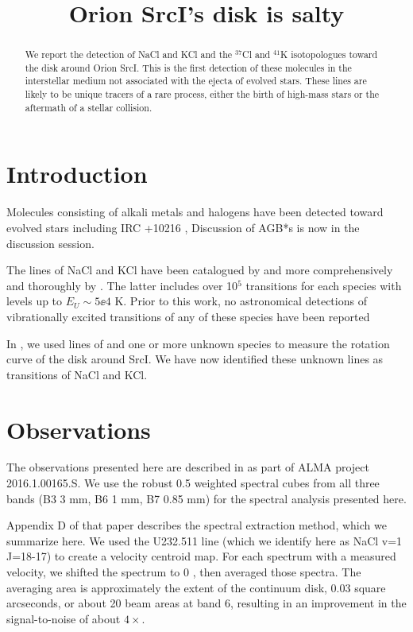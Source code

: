 \documentclass[twocolumn]{aastex62}
\newcommand{\sourcei}{SrcI\xspace}
\begin{document}


\title{Orion \sourcei's disk is salty}
\begin{abstract}
    We report the detection of NaCl and KCl and the $^{37}$Cl and $^{41}$K
    isotopologues toward the disk around Orion \sourcei.
    This is the first detection of these molecules in the interstellar
    medium not associated with the ejecta of evolved stars.
    These lines are likely to be unique tracers of a rare process, either
    the birth of high-mass stars or the aftermath of a stellar collision.
\end{abstract}

\section{Introduction}
Molecules consisting of alkali metals and halogens have been detected
toward evolved stars including IRC +10216 \citep{Cernicharo1987a},
{\color{red}Discussion of AGB*s is now in the discussion session.}

The lines of NaCl and KCl have been catalogued by \citet{Caris2004a}
and more comprehensively and thoroughly by \citet{Barton2014a}.
The latter includes over 10$^5$ transitions for each species
with levels up to $E_U\sim5\ee{4}$ K.  Prior to this work,
no astronomical detections of vibrationally excited transitions
of any of these species have been reported \citep[e.g., see the review
by][]{McGuire2018}

In \citet[][the brine paper]{Ginsburg2018b}, we used lines of
\water and one or more unknown species to measure the rotation curve of
the disk around \sourcei.  We have now identified these unknown lines as
transitions of NaCl and KCl.

\section{Observations}
The observations presented here are described in \citet{Ginsburg2018b} as part
of ALMA project 2016.1.00165.S.  We use the robust 0.5 weighted spectral cubes
from all three bands (B3 3 mm, B6 1 mm, B7 0.85 mm) for the spectral analysis
presented here.

Appendix D of that paper describes the spectral extraction method,
which we summarize here.  We used the U232.511 line (which we identify here as
NaCl v=1 J=18-17) to create a velocity centroid map.  For each spectrum with
a measured velocity, we shifted the spectrum to 0 \kms, then averaged those
spectra.  The averaging area is approximately the extent of the continuum
disk, 0.03 square arcseconds, or about 20 beam areas at band 6, resulting
in an improvement in the signal-to-noise of about $4\times$.
\end{document}
